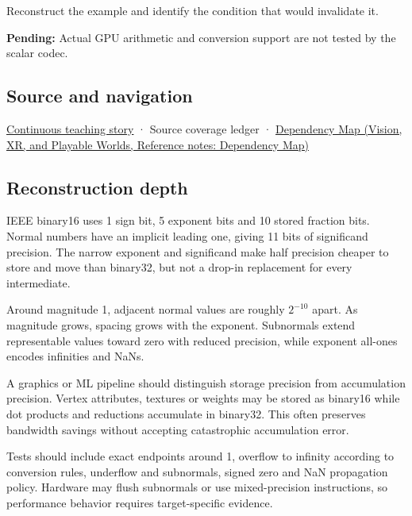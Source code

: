 Reconstruct the example and identify the condition that would invalidate it.

\textbf{Pending:} Actual GPU arithmetic and conversion support are not tested by the scalar codec.

\subsection{Source and navigation}\label{appendix-34443cec7170-source-and-navigation}

\hyperref[01-foundations-i-ch001-choosing-what-information-to-keep]{Continuous teaching story} · {Source coverage ledger} · \href{../07-Vision-XR-and-Playable-Worlds/main.pdf\#nameddest=appendix-4ad47bdd269a}{Dependency Map (Vision, XR, and Playable Worlds, Reference notes: Dependency Map)}

\subsection{Reconstruction depth}\label{appendix-34443cec7170-reconstruction-depth}

IEEE binary16 uses 1 sign bit, 5 exponent bits and 10 stored fraction bits. Normal numbers have an implicit leading one, giving 11 bits of significand precision. The narrow exponent and significand make half precision cheaper to store and move than binary32, but not a drop-in replacement for every intermediate.

Around magnitude 1, adjacent normal values are roughly \(2^{-10}\) apart. As magnitude grows, spacing grows with the exponent. Subnormals extend representable values toward zero with reduced precision, while exponent all-ones encodes infinities and NaNs.

A graphics or ML pipeline should distinguish storage precision from accumulation precision. Vertex attributes, textures or weights may be stored as binary16 while dot products and reductions accumulate in binary32. This often preserves bandwidth savings without accepting catastrophic accumulation error.

Tests should include exact endpoints around 1, overflow to infinity according to conversion rules, underflow and subnormals, signed zero and NaN propagation policy. Hardware may flush subnormals or use mixed-precision instructions, so performance behavior requires target-specific evidence.
